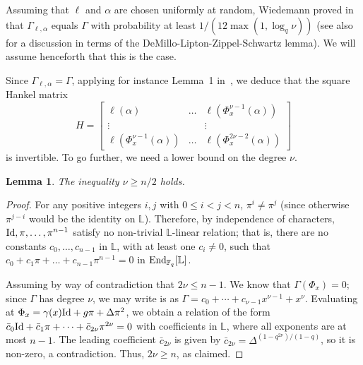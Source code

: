 \documentclass[sigconf]{acmart}
\newtheorem{lemma}{Lemma}
\newcommand{\F}{\mathbb{F}}
\renewcommand{\L}{\mathbb{L}}
\begin{document}
Assuming that $\ell$ and $\alpha$ are chosen uniformly at random,
Wiedemann proved in~\cite{Wiedemann:1986:SSL:13738.13744} that
$\Gamma_{\ell,\alpha}$ equals $\Gamma$ with probability at least
$1/(12 \max(1, \log_q \nu))$ (see
also~\cite{Kaltofen:1991:PEP:113379.113396,Kaltofen-saun:1991:WMS:646027.676885}
for a discussion in terms of the DeMillo-Lipton-Zippel-Schwartz
lemma). We will assume henceforth that this is the case.

 

Since $\Gamma_{\ell,\alpha}=\Gamma$, applying for instance Lemma~1
in~\cite{Kaltofen:1991:PEP:113379.113396}, we deduce that the square
Hankel matrix
\[H=\begin{bmatrix}
   \ell(\alpha) & \ldots & \ell(\Phi_x^{\nu-1}(\alpha)) \\
    \vdots & & \vdots  \\ 
  \ell(\Phi_x^{\nu-1}(\alpha)) &  \ldots & \ell(\Phi_x^{2\nu-2}(\alpha))
\end{bmatrix} \]
is invertible. To go further, we need a lower bound on the degree $\nu$.

\begin{lemma}
  The inequality $\nu\ge n/2$ holds.
\end{lemma}
\begin{proof}
   For any positive integers $i,j$ with $0 \le i < j < n$, $\pi^i \ne
   \pi^j$ (since otherwise $\pi^{j-i}$ would be the identity on
   $\L$). Therefore, by independence of characters, ${\rm Id}, \pi,
   \ldots, \pi^{n-1}$ satisfy no non-trivial $\L$-linear relation;
   that is, there are no constants $c_0, \ldots, c_{n-1}$ in $\L$,
   with at least one $c_i \neq 0$, such that $c_0 + c_1 \pi + \ldots +
   c_{n-1}\pi^{n-1}=0$ in ${\rm End}_{\F_q}[\L]$.

   Assuming by way of contradiction that $2\nu \le n-1$.  We know that
   $\Gamma(\Phi_x) = 0$; since $\Gamma$ has degree $\nu$, we may write
   is as $\Gamma = c_0 + \cdots + c_{\nu-1} x^{\nu-1} +
   x^\nu$. Evaluating at $\Phi_x = \gamma(x) {\rm Id} + g \pi + \Delta
   \pi^2$, we obtain a relation of the form $\bar c_0 {\rm Id} + \bar
   c_1 \pi + \cdots + \bar c_{2\nu} \pi^{2\nu} = 0$ with
   coefficients in $\L$, where all exponents are at most $n-1$. The
   leading coefficient $\bar c_{2\nu}$ is given by $\bar c_{2\nu} =
   \Delta^{(1-q^{2\nu})/(1-q)}$, so it is non-zero, a contradiction.
   Thus, $2\nu \ge n$, as claimed.
\end{proof}
\end{document}
